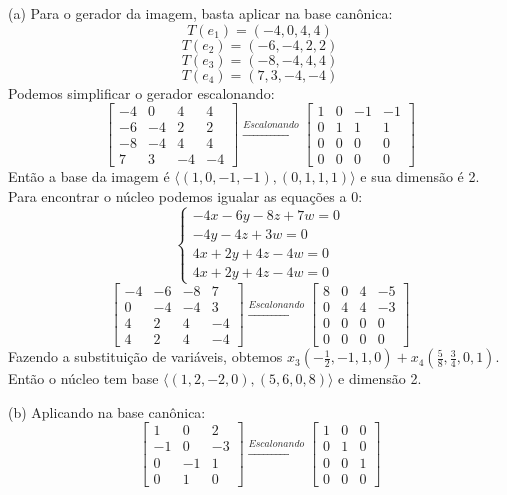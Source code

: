 \documentclass{homework}
\begin{document}
\exercise*
(a) Para o gerador da imagem, basta aplicar na base canônica:
\[T(e_1) = (-4,0,4,4)\]
\[T(e_2) = (-6,-4,2,2)\]
\[T(e_3) = (-8,-4,4,4)\]
\[T(e_4) = (7,3,-4,-4)\]
Podemos simplificar o gerador escalonando:
\[\begin{bmatrix}
-4 & 0 & 4 & 4\\
-6 & -4 & 2 & 2\\
-8 & -4 & 4 & 4\\
7 & 3 & -4 & -4
\end{bmatrix} \xrightarrow{Escalonando}
\begin{bmatrix}
1 & 0 & -1 & -1\\
0 & 1 & 1 & 1\\
0 & 0 & 0 & 0\\
0 & 0 & 0 & 0
\end{bmatrix}\]
Então a base da imagem é $\langle(1,0,-1,-1),(0,1,1,1)\rangle$ e sua dimensão é 2.
Para encontrar o núcleo podemos igualar as equações a $0$:
\[\begin{cases}
-4x-6y-8z+7w=0\\
-4y-4z+3w=0\\
4x+2y+4z-4w=0\\
4x+2y+4z-4w=0
\end{cases}\]
\[\begin{bmatrix}
-4 & -6 & -8 & 7\\
0 & -4 & -4 & 3\\
4 & 2 & 4 & -4\\
4 & 2 & 4 & -4
\end{bmatrix} \xrightarrow{Escalonando}
\begin{bmatrix}
8 & 0 & 4 & -5\\
0 & 4 & 4 & -3\\
0 & 0 & 0 & 0\\
0 & 0 & 0 & 0
\end{bmatrix}\]
Fazendo a substituição de variáveis, obtemos $x_3(-\frac{1}{2},-1,1,0) + x_4(\frac{5}{8},\frac{3}{4},0,1)$. Então o núcleo tem base $\langle(1,2,-2,0),(5,6,0,8)\rangle$ e dimensão 2.

(b) Aplicando na base canônica:
\[\begin{bmatrix}
1 & 0 & 2\\
-1 & 0 & -3\\
0 & -1 & 1\\
0 & 1 & 0
\end{bmatrix} \xrightarrow{Escalonando}
\begin{bmatrix}
1 & 0 & 0\\
0 & 1 & 0\\
0 & 0 & 1\\
0 & 0 & 0
\end{bmatrix}\]
\end{document}

